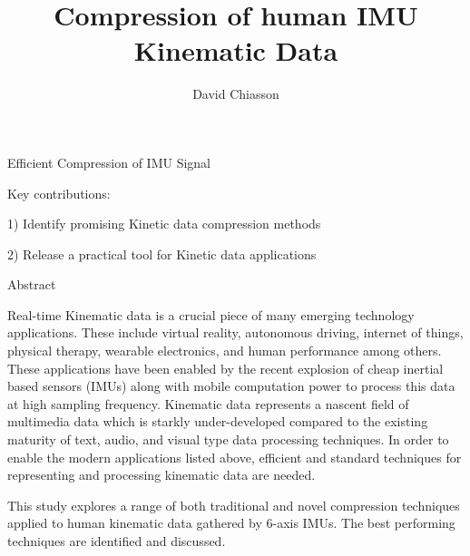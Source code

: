 \documentclass{article}
\title{Compression of human IMU Kinematic Data}
\author{David Chiasson}
\begin{document}
\maketitle

Efficient Compression of IMU Signal


Key contributions:

1) Identify promising Kinetic data compression methods

2) Release a practical tool for Kinetic data applications

\begin{outline}
\item {Abstract}

Real-time Kinematic data is a crucial piece of many emerging technology applications. These include virtual reality, autonomous driving, internet of things, physical therapy, wearable electronics, and human performance among others. These applications have been enabled by the recent explosion of cheap inertial based sensors (IMUs) along with mobile computation power to process this data at high sampling frequency. Kinematic data represents a nascent field of multimedia data which is starkly under-developed compared to the existing maturity of text, audio, and visual type data processing techniques. In order to enable the modern applications listed above, efficient and standard techniques for representing and processing kinematic data are needed.

This study explores a range of both traditional and novel compression techniques applied to human kinematic data gathered by 6-axis IMUs. The best performing techniques are identified and discussed.


\end{outline}
\end{document}
